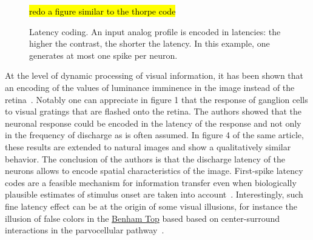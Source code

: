 \documentclass[brainsci, %
               review,submit,pdftex,moreauthors]{Definitions/mdpi}
\newcommand{\note}[1]{{\sethlcolor{yellow}\hl{#1}}}
\begin{document}
\begin{figure}
\centering
\note{redo a figure similar to the thorpe code}%
\caption{Latency coding. An input analog profile is encoded in latencies: the higher the contrast, the shorter the latency. In this example, one generates at most one spike per neuron.
}\label{fig:roc}
\end{figure}
At the level of dynamic processing of visual information, it has been shown that an encoding of the values of luminance imminence in the image instead of the retina~\citep{gollisch_rapid_2008}. Notably one can appreciate in figure 1 that the response of ganglion cells to visual gratings that are flashed onto the retina. The authors showed that the neuronal response could be encoded in the latency of the response and not only in the frequency of discharge as is often assumed. In figure 4 of the same article, these results are extended to natural images and show a qualitatively similar behavior. The conclusion of the authors is that the discharge latency of the neurons allows to encode spatial characteristics of the image. First-spike latency codes are a feasible mechanism for information transfer even when biologically plausible estimates of stimulus onset are taken into account~\citep{chase_first-spike_2007}. Interestingly, such fine latency effect can be at the origin of some visual illusions, for instance the illusion of false colors in the \href{https://michaelbach.de/ot/col-Benham/index.html}{Benham Top} based based on center-surround interactions in the parvocellular pathway~\citep{kenyon_theory_2004}.
\end{document}
